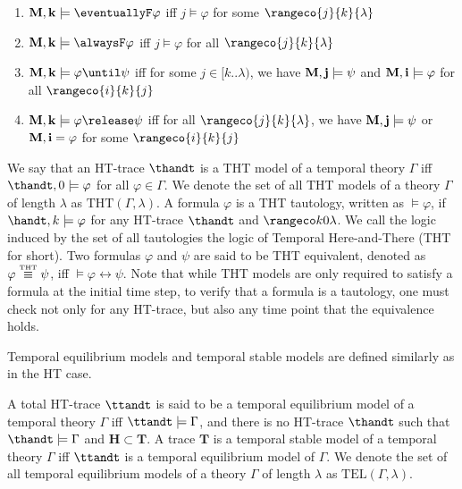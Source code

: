 \begin{definition}
\begin{enumerate}
  \item $\bf{M},k \models \eventuallyF \varphi$ iff $j \models \varphi$ for some $\rangeco{j}{k}{\lambda}$  
  \item $\bf{M},k \models \alwaysF \varphi$ iff $j \models \varphi$ for all $\rangeco{j}{k}{\lambda}$  
  \item $\bf{M}, k \models \varphi \until \psi$ iff for some $j \in[k . . \lambda)$, we have $\bf{M}, j \models \psi$ and $\bf{M}, i \models \varphi$ for all $\rangeco{i}{k}{j}$
  \item $\bf{M}, k \models \varphi \release \psi$ iff for all $\rangeco{j}{k}{\lambda}$, we have $\bf{M}, j \models \psi$ or $\bf{M},
    i=\varphi$ for some $\rangeco{i}{k}{j}$
\end{enumerate}
\end{definition}

We say that an HT-trace $\thandt$ is a THT model of a temporal theory
$\Gamma$ iff $\thandt,0 \models \varphi$ for all $\varphi \in
\Gamma$. We denote the set of all THT models of a theory $\Gamma$ of
length $\lambda$ as $\text{THT}(\Gamma,\lambda)$. A formula $\varphi$
is a THT tautology, written as $\models \varphi$, if
$\handt,k \models \varphi$ for any HT-trace $\thandt$ and
$\kinlambda$. We call the logic induced by the set of all tautologies
the logic of Temporal Here-and-There (THT for short). Two formulas
$\varphi$ and $\psi$ are said to be THT equivalent, denoted as
$\varphi \stackrel{\normalfont\mbox{\tiny THT}}{\equiv} \psi$, iff $\models \varphi \leftrightarrow
\psi$. Note that while THT models are only required to satisfy a
formula at the initial time step, to verify that a formula is a
tautology, one must check not only for any HT-trace, but also any time
point that the equivalence holds.

Temporal equilibrium models and temporal stable models are defined
similarly as in the HT case.

\begin{definition}
  A total HT-trace $\ttandt$ is said to be a temporal equilibrium
  model of a temporal theory $\Gamma$ iff $\ttandt \models \Gamma$,
  and there is no HT-trace $\thandt$ such that
  $\thandt \models \Gamma$ and $\bm{H} \subset \bm{T}$. A trace
  $\bm{T}$ is a temporal stable model of a temporal theory $\Gamma$
  iff $\ttandt$ is a temporal equilibrium model of $\Gamma$. We denote
  the set of all temporal equilibrium models of a theory $\Gamma$ of length $\lambda$
  as $\text{TEL}(\Gamma,\lambda)$.
\end{definition}

